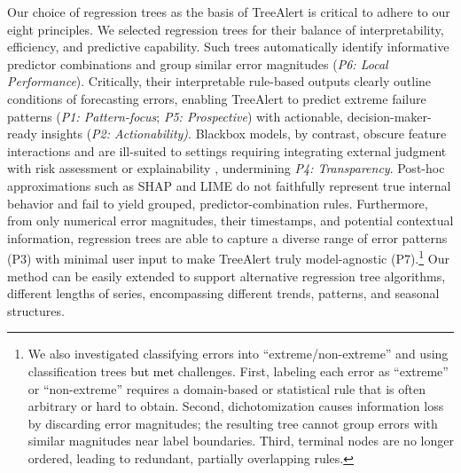 \documentclass[12pt]{article}
\newcommand{\galit}[1]{\textcolor{black}{#1}}
\begin{document}
Our %
choice of regression trees as the basis of TreeAlert is %
critical to adhere to our eight principles. %
We selected regression trees for their balance of interpretability, efficiency, and predictive capability. Such trees automatically identify informative predictor combinations and group similar error magnitudes (\emph{P6: Local Performance}). Critically, their interpretable rule-based outputs clearly outline conditions %
of forecasting errors, %
enabling TreeAlert to predict extreme failure patterns (\emph{P1: Pattern-focus}; \emph{P5: Prospective}) with actionable, decision-maker-ready insights (\emph{P2: Actionability)}. Blackbox models, by contrast, obscure feature interactions %
and are ill-suited to settings requiring integrating external judgment with risk assessment or explainability \citep{rudin2019, houssainy2021}, undermining \emph{P4: Transparency}. Post-hoc approximations such as SHAP and LIME do not faithfully represent true internal behavior \citep{rudin2019} and fail to yield grouped, predictor-combination rules. Furthermore, from only numerical error magnitudes, their timestamps, and potential contextual information, regression trees are able to capture a diverse range of error patterns (P3) with minimal user input to make TreeAlert truly model-agnostic (P7).\footnote{We also investigated classifying errors into “extreme/non-extreme” and using classification trees \galit{but met} %
challenges. First, labeling each error as “extreme” or “non-extreme” requires a domain-based or statistical rule that is often arbitrary or hard to obtain. Second, dichotomization causes information loss by discarding error magnitudes; the resulting tree cannot group errors with similar magnitudes near label boundaries. Third, terminal nodes are no longer ordered, leading to redundant, partially overlapping rules.}
Our method can be easily extended to support alternative regression tree algorithms, different lengths of series, encompassing different trends, patterns, and seasonal structures.
\end{document}
